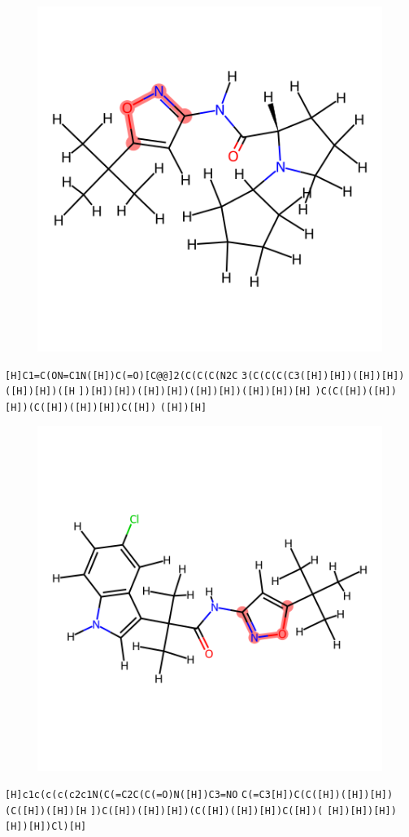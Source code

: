 \documentclass{article}
\begin{document}
\begin{figure}[ht]
\centering
    \includegraphics{mol266.png}
\end{figure}
\verb|[H]C1=C(ON=C1N([H])C(=O)[C@@]2(C(C(C(N2C| \verb|3(C(C(C(C3([H])[H])([H])[H])([H])[H])([H| \verb|])[H])[H])([H])[H])([H])[H])([H])[H])[H]| \verb|)C(C([H])([H])[H])(C([H])([H])[H])C([H])| \verb|([H])[H]|

\begin{figure}[ht]
\centering
    \includegraphics{mol267.png}
\end{figure}
\verb|[H]c1c(c(c(c2c1N(C(=C2C(C(=O)N([H])C3=NO| \verb|C(=C3[H])C(C([H])([H])[H])(C([H])([H])[H| \verb|])C([H])([H])[H])(C([H])([H])[H])C([H])(| \verb|[H])[H])[H])[H])[H])Cl)[H]|
\end{document}
